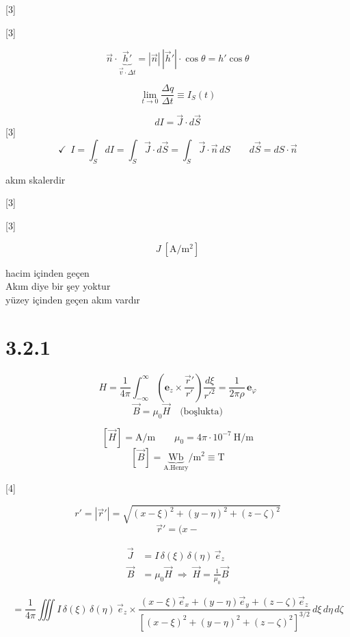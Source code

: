 \documentclass[11pt,a4paper]{article}
\begin{document}
[3]

[3]

\[ \vec{n}\cdot\underbrace{\vec{h}'}_{\vec{v}\cdot\Delta t} = |\vec{n}|\,|\vec{h}'|\cdot\cos\theta = h'\cos\theta \]

\[ \lim_{t\to 0}\frac{\Delta q}{\Delta t} \equiv I_S(t) \]

\[ dI = \vec{J}\cdot d\vec{S} \]
[3]
\[ \checkmark\ \ I = \int_S dI = \int_S \vec{J}\cdot d\vec{S} = \int_S \vec{J}\cdot\vec{n}\, dS \qquad d\vec{S} = dS\cdot\vec{n} \]

\noindent akım skalerdir

[3]

[3]

\[ J\ [\mathrm{A/m^2}] \]

\noindent hacim içinden geçen\\
Akım diye bir şey yoktur\\
yüzey içinden geçen akım vardır

\section{3.2.1}
\[ H = \frac{1}{4\pi}\int_{-\infty}^{\infty}\left(\mathbf{e}_z\times\frac{\vec{r}'}{r'}\right)\frac{d\xi}{r'^2} = \frac{1}{2\pi\rho}\,\mathbf{e}_\varphi \]
\[ \vec{B} = \mu_0\vec{H} \quad \text{(boşlukta)} \]

\[ [\vec{H}] = \mathrm{A/m} \qquad \mu_0 = 4\pi\cdot 10^{-7}\ \mathrm{H/m} \]
\[ [\vec{B}] = \underbrace{\mathrm{Wb}}_{\text{A.Henry}}/\mathrm{m}^2 \equiv \mathrm{T} \]

[4]

\[ r' = |\vec{r}'| = \sqrt{(x-\xi)^2 + (y-\eta)^2 + (z-\zeta)^2} \]
\[ \vec{r}' = (x- \]

\begin{align*}
  \vec{J} &= I\,\delta(\xi)\,\delta(\eta)\,\vec{e}_z \\
  \vec{B} &= \mu_0\vec{H} \;\Rightarrow\; \vec{H} = \frac{1}{\mu_0}\vec{B}
\end{align*}

\[ = \frac{1}{4\pi}\iiint I\,\delta(\xi)\,\delta(\eta)\,\vec{e}_z\times\frac{(x-\xi)\vec{e}_x + (y-\eta)\vec{e}_y + (z-\zeta)\vec{e}_z}{\left[(x-\xi)^2 + (y-\eta)^2 + (z-\zeta)^2\right]^{3/2}}\, d\xi\, d\eta\, d\zeta \]
\end{document}
